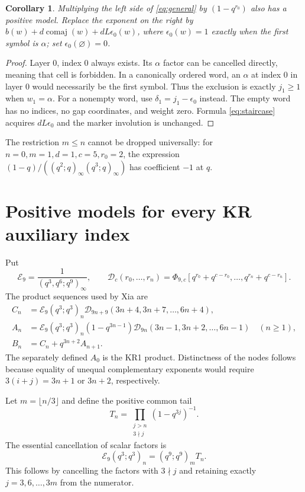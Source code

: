 \documentclass[11pt,a4paper]{article}
\newtheorem{corollary}[theorem]{Corollary}
\theoremstyle{definition}
\newcommand{\cm}{\operatorname{comaj}}
\newcommand{\DD}{\mathcal D}
\newcommand{\EE}{\mathcal E}
\begin{document}
\begin{corollary}\label{cor:forbidden}
Multiplying the left side of \eqref{eq:general} by $(1-q^{r_0})$
also has a positive model. Replace the exponent on the right by
$b(w)+d\cm(w)+dL\epsilon_0(w)$, where $\epsilon_0(w)=1$ exactly
when the first symbol is $\alpha$; set $\epsilon_0(\varnothing)=0$.
\end{corollary}
\begin{proof}
Layer $0$, index $0$ always exists. Its $\alpha$ factor can be cancelled
directly, meaning that cell is forbidden. In a canonically ordered word,
an $\alpha$ at index $0$ in layer $0$ would necessarily be the first symbol.
Thus the exclusion is exactly $j_1\ge1$ when $w_1=\alpha$.
For a nonempty word, use $\delta_1=j_1-\epsilon_0$ instead. The empty
word has no indices, no gap coordinates, and weight zero.
Formula \eqref{eq:staircase}
acquires $dL\epsilon_0$ and the marker involution is unchanged.
\end{proof}

\noindent The restriction $m\le n$ cannot be dropped universally:
for $n=0,m=1,d=1,c=5,r_0=2$, the expression
$(1-q)/((q^2;q)_\infty(q^3;q)_\infty)$ has coefficient $-1$ at $q$.

\section{Positive models for every KR auxiliary index}

Put
\[
\EE_9=\frac1{(q^3,q^6;q^9)_\infty},\qquad
\DD_c(r_0,\ldots,r_n)=
\Phi_{9,c}[q^{r_0}+q^{c-r_0},\ldots,q^{r_n}+q^{c-r_n}].
\]
The product sequences used by Xia \cite[eqs.\ (3.5)--(3.7)]{xia} are
\begin{align}
C_n&=\EE_9(q^3;q^3)_n
 \DD_{9n+9}(3n+4,3n+7,\ldots,6n+4),\label{eq:C}\\
A_n&=\EE_9(q^3;q^3)_n(1-q^{3n-1})
 \DD_{9n}(3n-1,3n+2,\ldots,6n-1)\quad(n\ge1),\\
B_n&=C_n+q^{3n+2}A_{n+1}.
\end{align}
The separately defined $A_0$ is the KR1 product. Distinctness of the nodes
follows because equality of unequal complementary exponents would require
$3(i+j)=3n+1$ or $3n+2$, respectively.

Let $m=\lfloor n/3\rfloor$ and define the positive common tail
\[
T_n=\prod_{\substack{j>n\\3\nmid j}}(1-q^{3j})^{-1}.
\]
The essential cancellation of scalar factors is
\begin{equation}\label{eq:prefactor}
\EE_9(q^3;q^3)_n=(q^9;q^9)_m T_n.
\end{equation}
This follows by cancelling the factors with $3\nmid j$ and retaining
exactly $j=3,6,\ldots,3m$ from the numerator.
\end{document}
